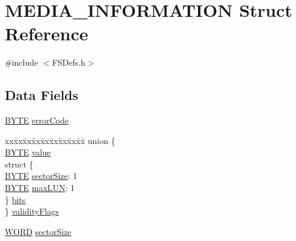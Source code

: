\hypertarget{struct_m_e_d_i_a___i_n_f_o_r_m_a_t_i_o_n}{}\section{M\+E\+D\+I\+A\+\_\+\+I\+N\+F\+O\+R\+M\+A\+T\+I\+O\+N Struct Reference}
\label{struct_m_e_d_i_a___i_n_f_o_r_m_a_t_i_o_n}


{\ttfamily \#include $<$F\+S\+Defs.\+h$>$}

\subsection*{Data Fields}
\begin{DoxyCompactItemize}
\item 
\hyperlink{_generic_type_defs_8h_a4ae1dab0fb4b072a66584546209e7d58}{B\+Y\+T\+E} \hyperlink{struct_m_e_d_i_a___i_n_f_o_r_m_a_t_i_o_n_aeed843858495988cfbec7df4f05862cb}{error\+Code}
\item 
\begin{tabbing}
xx\=xx\=xx\=xx\=xx\=xx\=xx\=xx\=xx\=\kill
union \{\\
\>\hyperlink{_generic_type_defs_8h_a4ae1dab0fb4b072a66584546209e7d58}{BYTE} \hyperlink{struct_m_e_d_i_a___i_n_f_o_r_m_a_t_i_o_n_a6bcc1b836cedcc585ba2018f6cb737ff}{value}\\
\>struct \{\\
\>\>\hyperlink{_generic_type_defs_8h_a4ae1dab0fb4b072a66584546209e7d58}{BYTE} \hyperlink{struct_m_e_d_i_a___i_n_f_o_r_m_a_t_i_o_n_a3fa20c05267a35f6f04b24993893a7e6}{sectorSize}: 1\\
\>\>\hyperlink{_generic_type_defs_8h_a4ae1dab0fb4b072a66584546209e7d58}{BYTE} \hyperlink{struct_m_e_d_i_a___i_n_f_o_r_m_a_t_i_o_n_af54daccc9b76a8da93ed53fd5442ba64}{maxLUN}: 1\\
\>\} \hyperlink{struct_m_e_d_i_a___i_n_f_o_r_m_a_t_i_o_n_a360158d9d04d794751f6fe9acb0a2ce4}{bits}\\
\} \hyperlink{struct_m_e_d_i_a___i_n_f_o_r_m_a_t_i_o_n_a857e86820509515f6cfae93c796e9b31}{validityFlags}\\

\end{tabbing}\item 
\hyperlink{_generic_type_defs_8h_a2b0e863dadf920709ec53d9088ee7c91}{W\+O\+R\+D} \hyperlink{struct_m_e_d_i_a___i_n_f_o_r_m_a_t_i_o_n_a4ada3fb75bebcfe42a7e2273b7c58fe0}{sector\+Size}
\end{DoxyCompactItemize}


